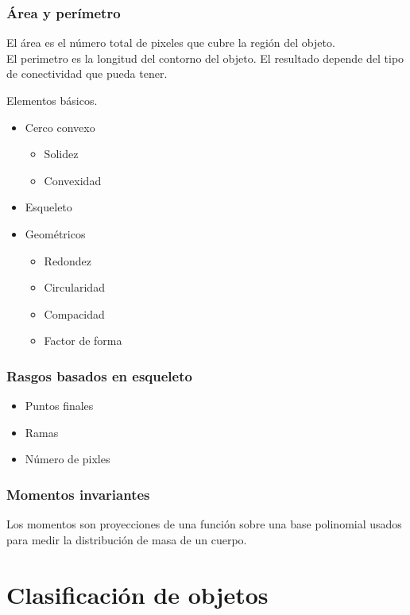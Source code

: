 \documentclass[a4paper, 11pt]{article}
\begin{document}
\subsubsection{Área y perímetro}

El área es el número total de pixeles que cubre la región del objeto.\\

El perimetro es la longitud del contorno del objeto. El resultado depende del tipo de conectividad que pueda tener.

Elementos básicos.
\begin{itemize}
\item Cerco convexo
  \begin{itemize}
  \item Solidez
  \item Convexidad
  \end{itemize}
\item Esqueleto
\item Geométricos
  \begin{itemize}
  \item Redondez
  \item Circularidad
  \item Compacidad
  \item Factor de forma
  \end{itemize}
\end{itemize}

\subsubsection{Rasgos basados en esqueleto}

\begin{itemize}
\item Puntos finales
\item Ramas
\item Número de pixles
\end{itemize}

\subsubsection{Momentos invariantes}

Los momentos son proyecciones de una función sobre una base polinomial usados para medir la distribución de masa de un cuerpo.

\pagebreak

\section{Clasificación de objetos}
\end{document}
